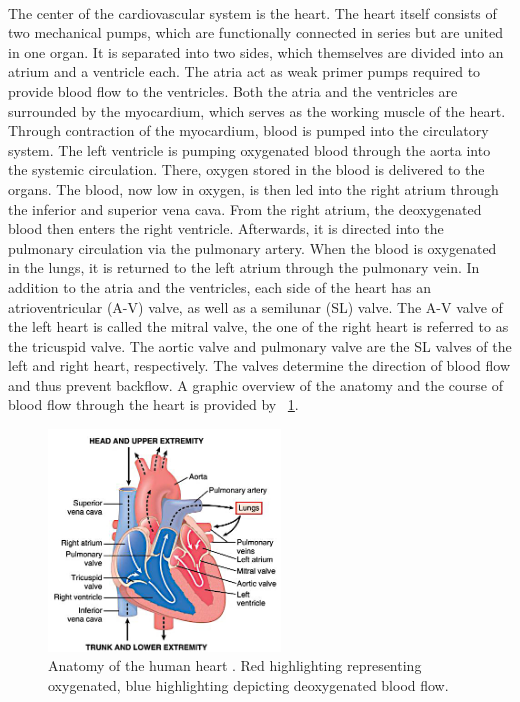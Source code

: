  \\The center of the cardiovascular system is the heart. The heart itself consists of two mechanical pumps, which are functionally connected in series but are united in one organ. It is separated into two sides, which themselves are divided into an atrium and a ventricle each. The atria act as weak primer pumps required to provide blood flow to the ventricles. \cite{HKS4} Both the atria and the ventricles are surrounded by the myocardium, which serves as the working muscle of the heart. Through contraction of the myocardium, blood is pumped into the circulatory system. \cite{HKS7} The left ventricle is pumping oxygenated blood through the aorta into the systemic circulation. There, oxygen stored in the blood is delivered to the organs. The blood, now low in oxygen, is then led into the right atrium through the inferior and superior vena cava. From the right atrium, the deoxygenated blood then enters the right ventricle. Afterwards, it is directed into the pulmonary circulation via the pulmonary artery. When the blood is oxygenated in the lungs, it is returned to the left atrium through the pulmonary vein. \cite{HKS4} In addition to the atria and the ventricles, each side of the heart has an atrioventricular (A-V) valve, as well as a semilunar (SL) valve. The A-V valve of the left heart is called the mitral valve, the one of the right heart is referred to as the tricuspid valve. The aortic valve and pulmonary valve are the SL valves of the left and right heart, respectively. The valves determine the direction of blood flow and thus prevent backflow. \cite{HKS7} A graphic overview of the anatomy and the course of blood flow through the heart is provided by \figurename~\ref{fig:heart_anat}.
 \begin{figure}[!ht]
   \centering
   \includegraphics[width=0.55\textwidth]{images/chapt_2/heart_1.jpg}
   \caption[Anatomy of the human heart \cite{GH20}]{Anatomy of the human heart \cite{GH20}. Red highlighting representing oxygenated, blue highlighting depicting deoxygenated blood flow.}
   \label{fig:heart_anat}
 \end{figure}
